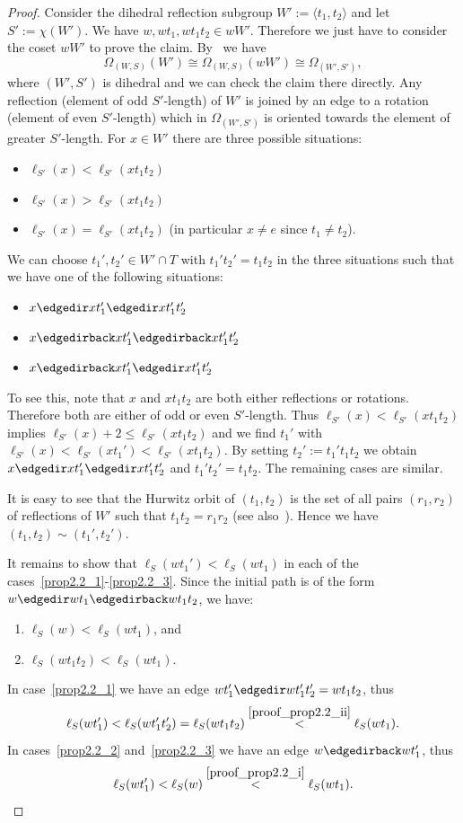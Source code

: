 \begin{proof}
Consider the dihedral reflection subgroup $W':= \langle t_1, t_2 \rangle$ and let $S':= \chi(W')$. We have $w, wt_1, wt_1t_2 \in wW'$. Therefore we just have to consider the coset $wW'$ to prove the claim. By~\cite[(1.4)~Theorem]{Dye91} we have 
\[
\Omega_{(W,S)}(W') \cong \Omega_{(W,S)}(wW') \cong \Omega_{(W',S')},
\]
where $(W',S')$ is dihedral and we can check the claim there directly. Any reflection (element of odd $S'$-length) of $W'$ is joined by an edge to a rotation (element of even $S'$-length) which in $\Omega_{(W',S')}$ is oriented towards the element of greater $S'$-length. For $x \in W'$ there are three possible situations:
\begin{itemize}
\item $\ell_{S'}(x)< \ell_{S'}(xt_1t_2)$
\item $\ell_{S'}(x)> \ell_{S'}(xt_1t_2)$
\item $\ell_{S'}(x)= \ell_{S'}(xt_1t_2)$ (in particular $x \neq e$ since $t_1 \neq t_2$).
\end{itemize}
We can choose $t_1', t_2' \in W' \cap T$ with $t_1't_2' = t_1t_2$ in the three situations such that we have one of the following situations:
\begin{itemize}
\item $x \edgedir xt_1' \edgedir xt_1' t_2'$
\item $x \edgedirback xt_1' \edgedirback xt_1' t_2'$
\item $x \edgedirback xt_1' \edgedir xt_1' t_2'$
\end{itemize}
To see this, note that $x$ and $xt_1t_2$ are both either reflections or rotations. Therefore both are either of odd or even $S'$-length. Thus $\ell_{S'}(x) < \ell_{S'}(xt_1t_2)$ implies $\ell_{S'}(x) +2 \leq \ell_{S'}(xt_1t_2)$ and we find $t_1'$ with $\ell_{S'}(x) < \ell_{S'}(xt_1') < \ell_{S'}(xt_1t_2)$. By setting $t_2' := t_1't_1t_2$ we obtain $x \edgedir xt_1' \edgedir xt_1' t_2'$ and $t_1't_2'=t_1t_2$. The remaining cases are similar.

It is easy to see that the Hurwitz orbit of $(t_1,t_2)$ is the set of all pairs $(r_1,r_2)$ of reflections of $W'$ such that $t_1t_2=r_1r_2$ (see also~\cite{BDSW14}). Hence we have $(t_1, t_2) \sim (t_1', t_2')$.

It remains to show that $\ell_S(wt_1')<\ell_S(wt_1)$ in each of the cases~\eqref{prop2.2_1}-\eqref{prop2.2_3}. Since the initial path is of the form $w \edgedir wt_1 \edgedirback wt_1t_2$, we have:
\begin{enumerate}[(\roman*)]
\item\label{proof_prop2.2_i} %
$\ell_S(w) < \ell_S(wt_1)$, and
\item\label{proof_prop2.2_ii} %
$\ell_S(wt_1t_2) < \ell_S(wt_1) $.
\end{enumerate}
In case~\eqref{prop2.2_1} we have an edge $wt_1' \edgedir wt_1't_2'= wt_1t_2$, thus 
\[
\ell_S(wt_1') < \ell_S(wt_1't_2') = \ell_S(wt_1t_2) \stackrel{\ref{proof_prop2.2_ii}}{<} \ell_S(wt_1).
\]
In cases~\eqref{prop2.2_2} and~\eqref{prop2.2_3} we have an edge $w \edgedirback wt_1'$, thus 
\[
\ell_S(wt_1') < \ell_S(w) \stackrel{\ref{proof_prop2.2_i}}{<} \ell_S(wt_1).\qedhere
\]
\end{proof}
